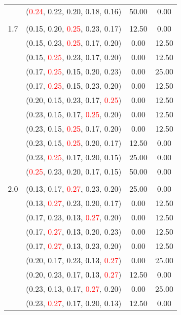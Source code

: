 \documentclass[10pt,a4paper]{report}
\begin{document}
\begin{center}
\begin{longtable}{clcc}
			&(\textcolor{red}{0.24}, 0.22, 0.20, 0.18, \textcolor{black}{0.16})&50.00&0.00\\
		&&&\\
		1.7			&(\textcolor{black}{0.15}, 0.20, \textcolor{red}{0.25}, 0.23, 0.17)&12.50&0.00\\
			&(\textcolor{black}{0.15}, 0.23, \textcolor{red}{0.25}, 0.17, 0.20)&0.00&12.50\\
			&(\textcolor{black}{0.15}, \textcolor{red}{0.25}, 0.23, 0.17, 0.20)&0.00&12.50\\
			&(0.17, \textcolor{red}{0.25}, \textcolor{black}{0.15}, 0.20, 0.23)&0.00&25.00\\
			&(0.17, \textcolor{red}{0.25}, \textcolor{black}{0.15}, 0.23, 0.20)&0.00&12.50\\
			&(0.20, \textcolor{black}{0.15}, 0.23, 0.17, \textcolor{red}{0.25})&0.00&12.50\\
			&(0.23, \textcolor{black}{0.15}, 0.17, \textcolor{red}{0.25}, 0.20)&0.00&12.50\\
			&(0.23, \textcolor{black}{0.15}, \textcolor{red}{0.25}, 0.17, 0.20)&0.00&12.50\\
			&(0.23, \textcolor{black}{0.15}, \textcolor{red}{0.25}, 0.20, 0.17)&12.50&0.00\\
			&(0.23, \textcolor{red}{0.25}, 0.17, 0.20, \textcolor{black}{0.15})&25.00&0.00\\
			&(\textcolor{red}{0.25}, 0.23, 0.20, 0.17, \textcolor{black}{0.15})&50.00&0.00\\
		&&&\\
		2.0			&(\textcolor{black}{0.13}, 0.17, \textcolor{red}{0.27}, 0.23, 0.20)&25.00&0.00\\
			&(\textcolor{black}{0.13}, \textcolor{red}{0.27}, 0.23, 0.20, 0.17)&0.00&12.50\\
			&(0.17, 0.23, \textcolor{black}{0.13}, \textcolor{red}{0.27}, 0.20)&0.00&12.50\\
			&(0.17, \textcolor{red}{0.27}, \textcolor{black}{0.13}, 0.20, 0.23)&0.00&12.50\\
			&(0.17, \textcolor{red}{0.27}, \textcolor{black}{0.13}, 0.23, 0.20)&0.00&12.50\\
			&(0.20, 0.17, 0.23, \textcolor{black}{0.13}, \textcolor{red}{0.27})&0.00&25.00\\
			&(0.20, 0.23, 0.17, \textcolor{black}{0.13}, \textcolor{red}{0.27})&12.50&0.00\\
			&(0.23, \textcolor{black}{0.13}, 0.17, \textcolor{red}{0.27}, 0.20)&0.00&25.00\\
			&(0.23, \textcolor{red}{0.27}, 0.17, 0.20, \textcolor{black}{0.13})&12.50&0.00\\

\end{longtable}
\end{center}
\end{document}
